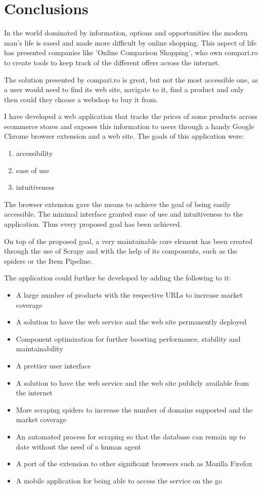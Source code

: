 \documentclass[12pt,a4paper,twoside]{report}
\begin{document}
\chapter{Conclusions}

In the world dominated by information, options and opportunities the modern man's life is eased and made more difficult by online shopping. This aspect of life has presented companies like 'Online Comparison Shopping', who own compari.ro to create tools to keep track of the different offers across the internet.

The solution presented by compari.ro is great, but not the most accessible one, as a user would need to find its web site, navigate to it, find a product and only then could they choose a webshop to buy it from.

I have developed a web application that tracks the prices of some products across ecommerce stores and exposes this information to users through a handy Google Chrome browser extension and a web site. The goals of this application were:

\begin{enumerate}
  \item accessibility
  \item ease of use
  \item intuitiveness
\end{enumerate}

The browser extension gave the means to achieve the goal of being easily accessible. The minimal interface granted ease of use and intuitiveness to the application. Thus every proposed goal has been achieved.

On top of the proposed goal, a very maintainable core element has been created through the use of Scrapy and with the help of its components, such as the spiders or the Item Pipeline.

The application could further be developed by adding the following to it:

\begin{itemize}
  \item A large number of products with the respective URLs to increase market coverage
  \item A solution to have the web service and the web site permanently deployed
  \item Component optimization for further boosting performance, stability and maintainability
  \item A prettier user interface
  \item A solution to have the web service and the web site publicly available from the internet
  \item More scraping spiders to increase the number of domains supported and the market coverage
  \item An automated process for scraping so that the database can remain up to date without the need of a human agent
  \item A port of the extension to other significant browsers such as Mozilla Firefox
  \item A mobile application for being able to access the service on the go
\end{itemize}





% 
\end{document}
